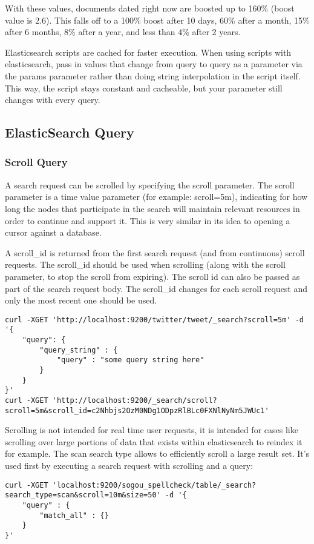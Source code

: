 \par With these values, documents dated right now are boosted up to 160\% (boost value is 2.6). This falls off to a 100\% boost after 10 days, 60\% after a month, 15\% after 6 months, 8\% after a year, and less than 4\% after 2 years. 
\par Elasticsearch scripts are cached for faster execution. When using scripts with elasticsearch, pass in values that change from query to query as a parameter via the params parameter rather than doing string interpolation in the script itself. This way, the script stays constant and cacheable, but your parameter still changes with every query.
\subsection{ElasticSearch Query}
\subsubsection{Scroll Query}
A search request can be scrolled by specifying the scroll parameter. The scroll parameter is a time value parameter (for example: scroll=5m), indicating for how long the nodes that participate in the search will maintain relevant resources in order to continue and support it. This is very similar in its idea to opening a cursor against a database.
\par A scroll\_id is returned from the first search request (and from continuous) scroll requests. The scroll\_id should be used when scrolling (along with the scroll parameter, to stop the scroll from expiring). The scroll id can also be passed as part of the search request body. The scroll\_id changes for each scroll request and only the most recent one should be used.
\begin{verbatim}
curl -XGET 'http://localhost:9200/twitter/tweet/_search?scroll=5m' -d '{
    "query": {
        "query_string" : {
            "query" : "some query string here"
        }
    }
}'
curl -XGET 'http://localhost:9200/_search/scroll?scroll=5m&scroll_id=c2Nhbjs2OzM0NDg1ODpzRlBLc0FXNlNyNm5JWUc1'
\end{verbatim}
\par Scrolling is not intended for real time user requests, it is intended for cases like scrolling over large portions of data that exists within elasticsearch to reindex it for example. The scan search type allows to efficiently scroll a large result set. It’s used first by executing a search request with scrolling and a query:
\begin{verbatim}
curl -XGET 'localhost:9200/sogou_spellcheck/table/_search?search_type=scan&scroll=10m&size=50' -d '{
    "query" : {
        "match_all" : {}
    }
}'
\end{verbatim}
